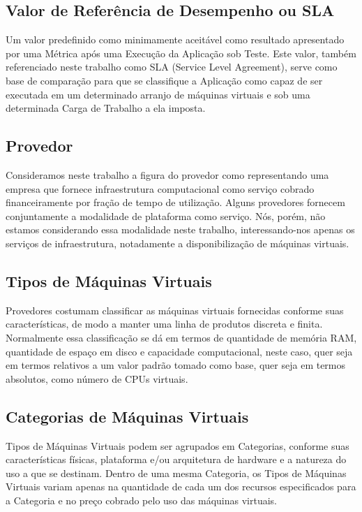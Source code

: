 \subsection{Valor de Referência de Desempenho ou SLA}
Um valor predefinido como minimamente aceitável como resultado apresentado por 
uma Métrica após uma Execução da Aplicação sob Teste. Este valor, também 
referenciado neste trabalho como SLA (Service Level Agreement), serve como base 
de comparação para que se classifique a Aplicação como capaz de ser executada 
em um determinado arranjo de máquinas virtuais e sob uma determinada Carga de
Trabalho a ela imposta.

\subsection{Provedor}
Consideramos neste trabalho a figura do provedor como representando uma empresa 
que fornece infraestrutura computacional como serviço cobrado financeiramente 
por fração de tempo de utilização. Alguns provedores fornecem conjuntamente a 
modalidade de plataforma como serviço. Nós, porém, não estamos considerando essa 
modalidade neste trabalho, interessando-nos apenas os serviços de infraestrutura, 
notadamente a disponibilização de máquinas virtuais.

\subsection{Tipos de Máquinas Virtuais}
Provedores costumam classificar as máquinas virtuais fornecidas conforme suas 
características, de modo a manter uma linha de produtos discreta e finita. 
Normalmente essa classificação se dá em termos de quantidade de memória RAM, 
quantidade de espaço em disco e capacidade computacional, neste caso, quer seja 
em termos relativos a um valor padrão tomado como base, quer seja em termos 
absolutos, como número de CPUs virtuais.

\subsection{Categorias de Máquinas Virtuais}
Tipos de Máquinas Virtuais podem ser agrupados em Categorias, conforme suas 
características físicas, plataforma e/ou arquitetura de hardware e a natureza do 
uso a que se destinam. Dentro de uma mesma Categoria, os Tipos de Máquinas 
Virtuais variam apenas na quantidade de cada um dos recursos especificados para 
a Categoria e no preço cobrado pelo uso das máquinas virtuais.

